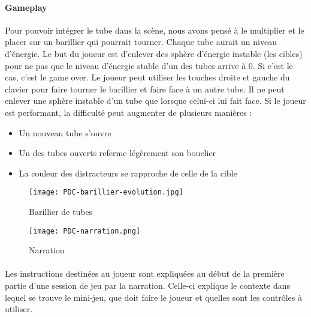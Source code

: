 \newpage

\paragraph{Gameplay}Pour pouvoir intégrer le tube dans la scène, nous avons pensé à le multiplier et le placer sur un barillier qui pourrait tourner. Chaque tube aurait un niveau
d'énergie. Le but du joueur est d'enlever des sphère d'énergie instable (les cibles) pour ne pas que le niveau d'énergie stable d'un des tubes arrive à 0. Si c'est le cas, c'est le
game over. Le joueur peut utiliser les touches droite et gauche du clavier pour faire tourner le barillier et faire face à un autre tube. Il ne peut enlever une sphère instable d'un
tube que lorsque celui-ci lui fait face. Si le joueur est performant, la difficulté peut augmenter de plusieurs manières :
\begin{itemize}
    \item Un nouveau tube s'ouvre
    \item Un des tubes ouverts referme légèrement son bouclier
    \item La couleur des distracteurs se rapproche de celle de la cible
\end{itemize}

\begin{figure}[H]
    \begin{center}
    \texttt{[image: PDC-barillier-evolution.jpg]}
    \end{center}
    \caption{Barillier de tubes}
\label{BarillierTube}
\end{figure}

\begin{wrapfigure}[5]{l}{4cm}
    \vspace{-25pt}
    \texttt{[image: PDC-narration.png]}
    \captionsetup{labelformat=simpleNumber}
    \caption{Narration}
\end{wrapfigure}

\paragraph{}Les instructions destinées au joueur sont expliquées au début de la première partie d'une session de jeu par la narration. Celle-ci explique le contexte dans lequel se
trouve le mini-jeu, que doit faire le joueur et quelles sont les contrôles à utiliser. \\ \\ \\

